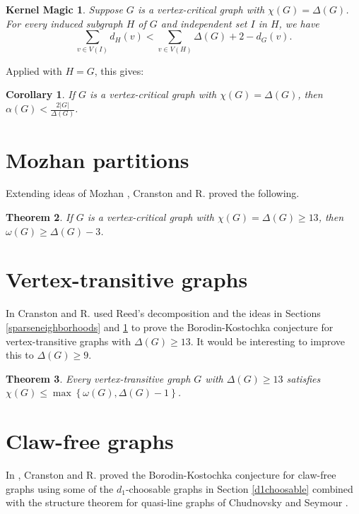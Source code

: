 \documentclass[12pt]{article}
\theoremstyle{plain}
\newtheorem{thm}{Theorem}
\newtheorem{cor}[thm]{Corollary}
\newtheorem*{KernelMagic}{Kernel Magic}
\theoremstyle{definition}
\theoremstyle{remark}
\newcommand{\set}[1]{\left\{ #1 \right\}}
\newcommand{\card}[1]{\left|#1\right|}
\begin{document}
\begin{KernelMagic}
Suppose $G$ is a vertex-critical graph with $\chi(G) = \Delta(G)$.  For every induced subgraph $H$ of $G$ and independent set $I$ in $H$, we have
\[\sum_{v \in V(I)} d_H(v) < \sum_{v \in V(H)} \Delta(G) + 2 - d_G(v).\]
\end{KernelMagic}

Applied with $H=G$, this gives:
\begin{cor}
If $G$ is a vertex-critical graph with $\chi(G) = \Delta(G)$, then $\alpha(G) < \frac{2\card{G}}{\Delta(G)}$.
\end{cor}

\section{Mozhan partitions}\label{shuffle}
Extending ideas of Mozhan \cite{mozhan1983}, Cranston and R. \cite{bigcliques} proved the following.
\begin{thm}
If $G$ is a vertex-critical graph with $\chi(G) = \Delta(G) \ge 13$, then $\omega(G) \ge \Delta(G) - 3$.
\end{thm}

\section{Vertex-transitive graphs}
In \cite{vertextransitive} Cranston and R. used Reed's decomposition and the ideas in Sections \ref{sparseneighborhoods} and \ref{shuffle} to prove the Borodin-Kostochka conjecture for 
vertex-transitive graphs with $\Delta(G) \ge 13$.  It would be interesting to improve this to $\Delta(G) \ge 9$.

\begin{thm}
Every vertex-transitive graph $G$ with $\Delta(G) \ge 13$ satisfies $\chi(G) \le \max\set{\omega(G), \Delta(G) - 1}$.
\end{thm}

\section{Claw-free graphs}
In \cite{cranstonrabernclaw}, Cranston and R. proved the Borodin-Kostochka conjecture for claw-free graphs using some of the $d_1$-choosable graphs in Section \ref{d1choosable} 
combined with the structure theorem for quasi-line graphs of Chudnovsky and Seymour \cite{chudnovsky2005structure}.


\end{document}
